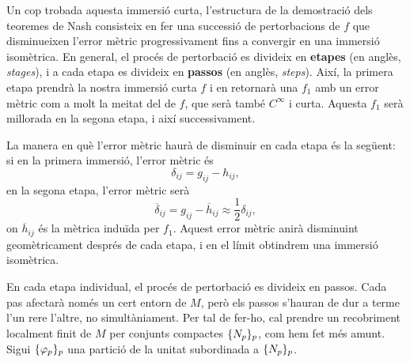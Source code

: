 Un cop trobada aquesta immersió curta, l'estructura de la demostració dels teoremes de Nash consisteix en fer una successió de pertorbacions de $f$ que disminueixen l'error mètric progressivament fins a convergir en una immersió isomètrica. En general, el procés de pertorbació es divideix en \textbf{etapes} (en anglès, \textit{stages}), i a cada etapa es divideix en \textbf{passos} (en anglès, \textit{steps}). Així, la primera etapa prendrà la nostra immersió curta $f$ i en retornarà una $f_1$ amb un error mètric com a molt la meitat del de $f$, que serà també $C^\infty$ i curta. Aquesta $f_1$ serà millorada en la segona etapa, i així successivament.

La manera en què l'error mètric haurà de disminuir en cada etapa és la següent: si en la primera immersió, l'error mètric és 
\begin{equation*}
    \delta_{ij} = g_{ij}-h_{ij},
\end{equation*}
en la segona etapa, l'error mètric serà
\begin{equation*}
    \overline\delta_{ij} = g_{ij}-\overline{h}_{ij}\approx \frac12\delta_{ij},
\end{equation*}
on $\overline{h}_{ij}$ és la mètrica induïda per $f_1$. Aquest error mètric anirà disminuint geomètricament després de cada etapa, i en el límit obtindrem una immersió isomètrica.

En cada etapa individual, el procés de pertorbació es divideix en passos. Cada pas afectarà només un cert entorn de $M$, però els passos s'hauran de dur a terme l'un rere l'altre, no simultàniament. Per tal de fer-ho, cal prendre un recobriment localment finit de $M$ per conjunts compactes $\{N_p\}_p$, com hem fet més amunt. Sigui $\{\varphi_p\}_p$ una partició de la unitat subordinada a $\{N_p\}_p$. 

